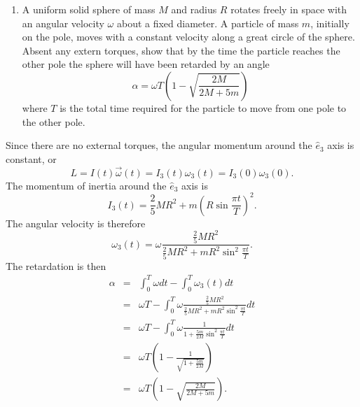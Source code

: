 \documentclass[letterpaper,11pt]{article}
\begin{document}
\begin{enumerate}[resume]
 \item A uniform solid sphere of mass $M$ and radius $R$ rotates freely in space with an angular velocity $\omega$ about a fixed diameter.  A particle of mass $m$, initially on the pole, moves with a constant velocity along a great circle of the sphere.  Absent any extern torques, show that by the time the particle reaches the other pole the sphere will have been retarded by an angle
 \begin{equation*}
  \alpha = \omega T \left( 1 - \sqrt{\frac{2M}{2M + 5m}} \right)
 \end{equation*}
 where $T$ is the total time required for the particle to move from one pole to the other pole.
\end{enumerate}

Since there are no external torques, the angular momentum around the $\hat{e}_3$ axis is constant, or
\begin{equation*}
 L = I(t) \vec{\omega}(t) = I_3(t) \omega_3(t) = I_3(0) \omega_3(0).
\end{equation*}
The momentum of inertia around the $\hat{e}_3$ axis is
\begin{equation*}
 I_3(t) = \frac{2}{5}MR^2 + m\left(R\sin\frac{\pi t}{T}\right)^2.
\end{equation*}
The angular velocity is therefore
\begin{equation*}
 \omega_3(t) = \omega \frac{\frac{2}{5}MR^2}{\frac{2}{5}MR^2 + mR^2\sin^2\frac{\pi t}{T}}.
\end{equation*}
The retardation is then
\begin{eqnarray*}
 \alpha & = & \int_0^T \omega dt - \int_0^T \omega_3(t) dt \\
 & = & \omega T - \int_0^T \omega \frac{\frac{2}{5}MR^2}{\frac{2}{5}MR^2 + mR^2\sin^2\frac{\pi t}{T}} dt \\
 & = & \omega T - \int_0^T \omega \frac{1}{1 + \frac{5m}{2M}\sin^2\frac{\pi t}{T}} dt \\
 & = & \omega T \left(1 - \frac{1}{\sqrt{1 + \frac{5m}{2M}}} \right) \\
 & = & \omega T \left(1 - \sqrt{\frac{2M}{2M + 5m}} \right).
\end{eqnarray*}
\end{document}
